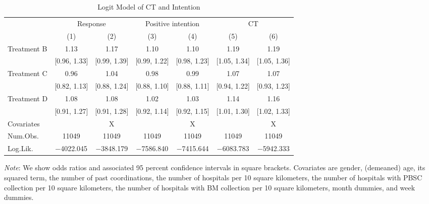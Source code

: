\documentclass [12pt, a4paper]{article}
\begin{document}
\begin{table}[H]

\caption{\label{tab:stock-logit}Logit Model of CT and Intention}
\centering
\fontsize{9}{11}\selectfont
\begin{threeparttable}
\begin{tabular}[t]{lcccccc}
\toprule
\multicolumn{1}{c}{ } & \multicolumn{2}{c}{Response} & \multicolumn{2}{c}{Positive intention} & \multicolumn{2}{c}{CT} \\
\cmidrule(l{3pt}r{3pt}){2-3} \cmidrule(l{3pt}r{3pt}){4-5} \cmidrule(l{3pt}r{3pt}){6-7}
  & (1) & (2) & (3) & (4) & (5) & (6)\\
\midrule
Treatment B & \num{1.13} & \num{1.17} & \num{1.10} & \num{1.10} & \num{1.19} & \num{1.19}\\
 & {}[\num{0.96}, \num{1.33}] & {}[\num{0.99}, \num{1.39}] & {}[\num{0.99}, \num{1.22}] & {}[\num{0.98}, \num{1.23}] & {}[\num{1.05}, \num{1.34}] & {}[\num{1.05}, \num{1.36}]\\
Treatment C & \num{0.96} & \num{1.04} & \num{0.98} & \num{0.99} & \num{1.07} & \num{1.07}\\
 & {}[\num{0.82}, \num{1.13}] & {}[\num{0.88}, \num{1.24}] & {}[\num{0.88}, \num{1.10}] & {}[\num{0.88}, \num{1.11}] & {}[\num{0.94}, \num{1.22}] & {}[\num{0.93}, \num{1.23}]\\
Treatment D & \num{1.08} & \num{1.08} & \num{1.02} & \num{1.03} & \num{1.14} & \num{1.16}\\
 & {}[\num{0.91}, \num{1.27}] & {}[\num{0.91}, \num{1.28}] & {}[\num{0.92}, \num{1.14}] & {}[\num{0.92}, \num{1.15}] & {}[\num{1.01}, \num{1.30}] & {}[\num{1.02}, \num{1.33}]\\
\midrule
Covariates &  & X &  & X &  & X\\
Num.Obs. & \num{11049} & \num{11049} & \num{11049} & \num{11049} & \num{11049} & \num{11049}\\
Log.Lik. & \num{-4022.045} & \num{-3848.179} & \num{-7586.840} & \num{-7415.644} & \num{-6083.783} & \num{-5942.333}\\
\bottomrule
\end{tabular}
\begin{tablenotes}
\item \emph{Note}: We show odds ratios and associated 95 percent confidence intervals in square brackets. Covariates are gender, (demeaned) age, its squared term, the number of past coordinations, the number of hospitals per 10 square kilometers, the number of hospitals with PBSC collection per 10 square kilometers, the number of hospitals with BM collection per 10 square kilometers, month dummies, and week dummies.
\end{tablenotes}
\end{threeparttable}
\end{table}
\end{document}
